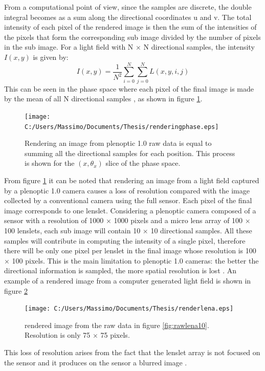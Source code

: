 From a computational point of view, since the samples are discrete, the double integral becomes as a sum along the directional coordinates u and v. The total intensity of each pixel of the rendered image is then the sum of the intensities of the pixels that form the corresponding sub image divided by the number of pixels in the sub image. For a light field with N $\times$ N directional samples, the intensity $I(x,y)$ is given by:
\begin{equation}
\label{eq:rendering3}
I(x,y) = \dfrac{1}{N^2}\sum_{i=0}^N\sum_{j=0}^N L(x,y,i,j)
\end{equation}
This can be seen in the phase space where each pixel of the final image is made by the mean of all N directional samples \cite{georgiev2010focused}, as shown in figure \ref{fig:rendering2}.
 \begin{figure}[H]
 	\centering
 	\texttt{[image: C:/Users/Massimo/Documents/Thesis/renderingphase.eps]}
 	\caption{\label{fig:rendering2} Rendering an image from plenoptic 1.0 raw data is equal to summing all the directional samples for each position. This process is shown for the $(x,\theta_x)$ slice of the phase space. \cite{georgiev2010focused} }
 \end{figure}
 From figure \ref{fig:rendering2} it can be noted that rendering an image from a light field captured by a plenoptic 1.0 camera causes a loss of resolution compared with the image collected by a conventional camera using the full sensor. Each pixel of the final image corresponds to one lenslet. Considering a plenoptic camera composed of a sensor with a resolution of 1000 $\times$ 1000 pixels and a micro lens array of 100 $\times$ 100 lenslets, each sub image will contain 10 $\times$ 10 directional samples. All these samples will contribute in computing the intensity of a single pixel, therefore there will be only one pixel per lenslet in the final image whose resolution is 100 $\times$ 100 pixels. This is the main limitation to plenoptic 1.0 cameras: the better the directional information is sampled, the more spatial resolution is lost \cite{georgiev2010focused, ng2006digital}. An example of a rendered image from a computer generated light field is shown in figure \ref{fig:renderlena}
 \begin{figure}[H]
 	\centering
 	\texttt{[image: C:/Users/Massimo/Documents/Thesis/renderlena.eps]}
 	\caption{\label{fig:renderlena} rendered image from the raw data in figure \ref{fig:rawlena10}. Resolution is only 75 $\times$ 75 pixels.  }
 \end{figure}
 This loss of resolution arises from the fact that the lenslet array is not focused on the sensor and it produces on the sensor a blurred image \cite{georgiev2010focused}.
